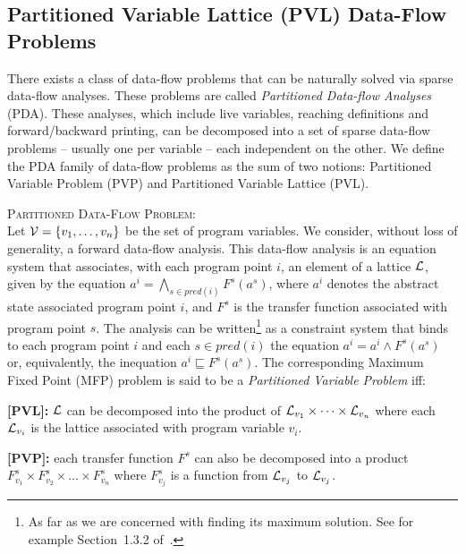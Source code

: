 \subsection{Partitioned Variable Lattice (PVL) Data-Flow Problems}
\label{sec:ssi:pereira:pvpPvl}

There exists a class of data-flow problems that can be naturally solved via sparse data-flow analyses.
These problems are called {\em Partitioned Data-flow Analyses} (PDA).
These analyses, which include live variables, reaching definitions and forward/backward printing, can be decomposed into a set of sparse data-flow problems -- usually one per variable -- each independent on the other.
We define the PDA family of data-flow problems as the sum of two notions: Partitioned Variable Problem (PVP) and Partitioned Variable Lattice (PVL).

\begin{definition}
\label{pro:pvp}
\textsc{Partitioned Data-Flow Problem}:\\Let ${\cal V}=\{v_1,\dots,v_n\}$ be the set of program variables.
We consider, without loss of generality, a forward data-flow analysis.
This data-flow analysis is an equation system that associates, with each program point $i$, an element of a lattice ${\cal L}$, given by the equation $a^i = \bigwedge_{s \in \mathit{pred}(i)} F^s(a^s)$, where $a^i$ denotes the abstract state associated  program point $i$, and $F^s$ is the transfer function associated with program point $s$.
The analysis can be written\footnote{As far as we are concerned with finding its maximum solution. See for example Section~1.3.2 of~\cite{Nielson05}.} as a constraint system that binds to each program point $i$ and each $s\in \mathit{pred}(i)$ the equation $a^i = a^i \wedge  F^s(a^s)$ or, equivalently, the inequation $a^i \sqsubseteq  F^s(a^s)$.
The corresponding Maximum Fixed Point (MFP) problem is said to be a \emph{Partitioned Variable Problem} iff:
\begin{description}
\item {\bf [PVL]:} $\cal L$ can be decomposed into the product of ${\cal L}_{v_1}\times \dots \times {\cal L}_{v_n}$ where each ${\cal L}_{v_i}$ is the lattice associated with program variable $v_i$.
\item {\bf [PVP]:} each transfer function $F^s$ can also be decomposed into a product $F_{v_1}^s\times F_{v_2}^s \times \dots \times F_{v_n}^s$ where $F_{v_j}^s$ is a function from ${\cal L}_{v_j}$ to ${\cal L}_{v_j}$.
\end{description}
\end{definition}

